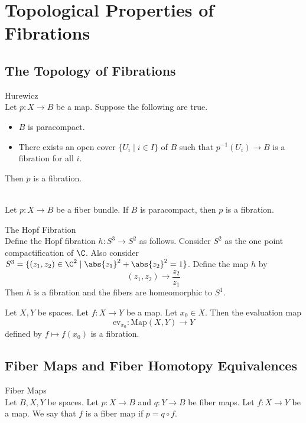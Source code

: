\documentclass[a4paper]{article}
\begin{document}
\pagebreak
\section{Topological Properties of Fibrations}
\subsection{The Topology of Fibrations}
\begin{thm}{Hurewicz}{}\\
Let $p:X\to B$ be a map. Suppose the following are true. 
\begin{itemize}
\item $B$ is paracompact. 
\item There exists an open cover $\{U_i\;|\;i\in I\}$ of $B$ such that $p^{-1}(U_i)\to B$ is a fibration for all $i$. 
\end{itemize}
Then $p$ is a fibration. 
\end{thm}

\begin{lmm}{}{}\\
Let $p:X\to B$ be a fiber bundle. If $B$ is paracompact, then $p$ is a fibration. 
\end{lmm}

\begin{eg}{The Hopf Fibration}{}\\
Define the Hopf fibration $h:S^3\to S^2$ as follows. Consider $S^2$ as the one point compactification of $\C$. Also consider $S^3=\{(z_1,z_2)\in\C^2\;|\;\abs{z_1}^2+\abs{z_2}^2=1\}$. Define the map $h$ by $$(z_1,z_2)\to\frac{z_2}{z_1}$$ Then $h$ is a fibration and the fibers are homeomorphic to $S^1$. 
\end{eg}

\begin{prp}{}{} Let $X,Y$ be spaces. Let $f:X\to Y$ be a map. Let $x_0\in X$. Then the evaluation map $$\text{ev}_{x_0}:\text{Map}(X,Y)\to Y$$ defined by $f\mapsto f(x_0)$ is a fibration. 
\end{prp}

\subsection{Fiber Maps and Fiber Homotopy Equivalences}
\begin{defn}{Fiber Maps}{}\\
Let $B,X,Y$ be spaces. Let $p:X\to B$ and $q:Y\to B$ be fiber maps. Let $f:X\to Y$ be a map. We say that $f$ is a fiber map if $p=q\circ f$. 
\end{defn}
\end{document}
